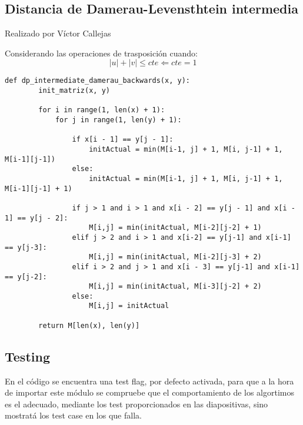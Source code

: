 \vfill
\subsection{Distancia de Damerau-Levensthtein intermedia}
{\color{red}Realizado por Víctor Callejas}

Considerando las operaciones de trasposición cuando:
\begin{equation}
    |u| + |v| 	\leqslant cte \Leftarrow cte = 1
\end{equation}
\begin{lstlisting}[label={list:first},caption=Damerau-Levensthtein intermedio]
    def dp_intermediate_damerau_backwards(x, y):
        init_matriz(x, y)

        for i in range(1, len(x) + 1):
            for j in range(1, len(y) + 1):

                if x[i - 1] == y[j - 1]:
                    initActual = min(M[i-1, j] + 1, M[i, j-1] + 1, M[i-1][j-1])
                else:
                    initActual = min(M[i-1, j] + 1, M[i, j-1] + 1, M[i-1][j-1] + 1)

                if j > 1 and i > 1 and x[i - 2] == y[j - 1] and x[i - 1] == y[j - 2]:
                    M[i,j] = min(initActual, M[i-2][j-2] + 1)
                elif j > 2 and i > 1 and x[i-2] == y[j-1] and x[i-1] == y[j-3]:
                    M[i,j] = min(initActual, M[i-2][j-3] + 2)
                elif i > 2 and j > 1 and x[i - 3] == y[j-1] and x[i-1] == y[j-2]:
                    M[i,j] = min(initActual, M[i-3][j-2] + 2)
                else:
                    M[i,j] = initActual

        return M[len(x), len(y)]
\end{lstlisting}

\subsection{Testing}
En el código se encuentra una test flag, por defecto activada, para que a la hora de importar este módulo se compruebe que el comportamiento de los algortimos es el adecuado, mediante los test proporcionados en las diapositivas, sino mostratá los test case en los que falla.

\newpage